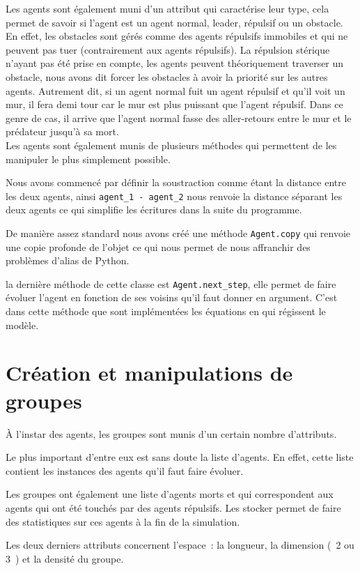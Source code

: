 \documentclass[french, a4paper, 12pt, openany]{report}
\begin{document}
	Les agents sont également muni d'un attribut qui caractérise leur type, cela permet de savoir si l'agent est un agent normal, leader, répulsif ou un obstacle. En effet, les obstacles sont gérés comme des agents répulsifs immobiles et qui ne peuvent pas tuer (contrairement aux agents répulsifs). La répulsion stérique n'ayant pas été prise en compte, les agents peuvent théoriquement traverser un obstacle, nous avons dit forcer les obstacles à avoir la priorité sur les autres agents. Autrement dit, si un agent normal fuit un agent répulsif et qu'il voit un mur, il fera demi tour car le mur est plus puissant que l'agent répulsif. Dans ce genre de cas, il arrive que l'agent normal fasse des aller-retours entre le mur et le prédateur jusqu'à sa mort. \\
	
	Les agents sont également munis de plusieurs méthodes qui permettent de les manipuler le plus simplement possible.
	
	Nous avons commencé par définir la soustraction comme étant la distance entre les deux agents, ainsi \verb|agent_1 - agent_2| nous renvoie la distance séparant les deux agents ce qui simplifie les écritures dans la suite du programme.
	
	De manière assez standard nous avons créé une méthode \verb|Agent.copy| qui renvoie une copie profonde de l'objet ce qui nous permet de nous affranchir des problèmes d'alias de Python.
	
	la dernière méthode de cette classe est \verb|Agent.next_step|, elle permet de faire évoluer l'agent en fonction de ses voisins qu'il faut donner en argument. C'est dans cette méthode que sont implémentées les équations en qui régissent le modèle.
	
\section{Création et manipulations de groupes}
	À l'instar des agents, les groupes sont munis d'un certain nombre d'attributs.
	
	Le plus important d'entre eux est sans doute la liste d'agents. En effet, cette liste contient les instances des agents qu'il faut faire évoluer.
	
	Les groupes ont également une liste d'agents morts et qui correspondent aux agents qui ont été touchés par des agents répulsifs. Les stocker permet de faire des statistiques sur ces agents à la fin de la simulation.
	
	Les deux derniers attributs concernent l'espace~: la longueur, la dimension (~2 ou 3~) et la densité du groupe. \\
	
\end{document}
